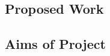 \documentclass[../CHEFCookingHelperForEveryonesFridge.tex]{subfiles}
\begin{document}
\subsection{Proposed Work}

\subsection{Aims of Project}
\end{document}
